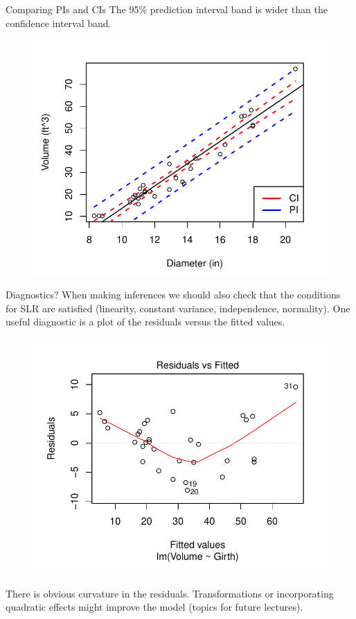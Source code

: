 \documentclass[10pt]{beamer}
\begin{document}
\begin{frame}{Comparing PIs and CIs}
The 95\% prediction interval band is wider than the confidence interval band.
\begin{figure}
\includegraphics[scale=0.65]{figure/scatter7.pdf}
\end{figure}
\end{frame}

\begin{frame}{Diagnostics?}
When making inferences we should also check that the conditions for SLR are satisfied (linearity, constant variance, independence, normality).  One useful diagnostic is a plot of the residuals versus the fitted values.
\begin{figure}
\includegraphics[scale=0.45]{figure/resid.pdf}
\end{figure}
There is obvious curvature in the residuals.  Transformations or incorporating quadratic effects might improve the model (topics for future lectures). 
\end{frame}
\end{document}
